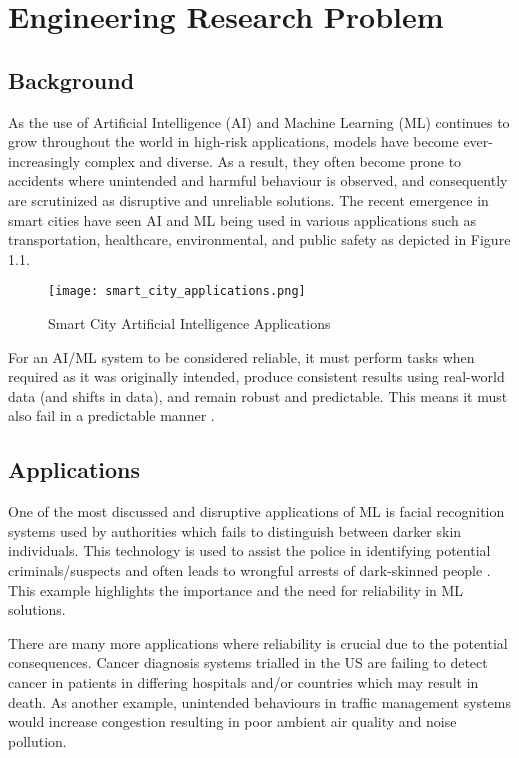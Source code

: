 \chapter{Engineering Research Problem}
\setcounter{page}{1}
\label{chap:chap1}

\section{Background }
As the use of Artificial Intelligence (AI) and Machine 
Learning (ML) continues to grow throughout the world 
in high-risk applications, models have become 
ever-increasingly complex and diverse. As a result, 
they often become prone to accidents where unintended 
and harmful behaviour is observed, and consequently are 
scrutinized as disruptive and unreliable solutions. The 
recent emergence in smart cities have seen AI and ML being 
used in various applications such as transportation, 
healthcare, environmental, and public safety as depicted in Figure 1.1.

\begin{figure}[h]
    \texttt{[image: smart\_city\_applications.png]}
    \caption{Smart City Artificial Intelligence Applications \cite{chen}}
    \label{fig:smart}
\end{figure}

\enlargethispage{2\baselineskip}
For an AI/ML system to be considered reliable, it must 
perform tasks when required as it was originally 
intended, produce consistent results using real-world 
data (and shifts in data), and remain robust and 
predictable. This means it must also fail in a 
predictable manner \cite{Saif}. 

\section{Applications}
One of the most discussed and disruptive applications of ML is facial 
recognition systems used by authorities which fails to distinguish 
between darker skin individuals. This technology is used to assist the 
police in identifying potential criminals/suspects and often leads to 
wrongful arrests of dark-skinned people \cite{Moutafis}. This example highlights the 
importance and the need for reliability in ML solutions. 

There are many more applications where reliability is crucial due to the 
potential consequences. Cancer diagnosis systems trialled in the US are 
failing to detect cancer in patients in differing hospitals and/or countries which may result 
in death. As another example, unintended behaviours in traffic management systems would 
increase congestion resulting in poor ambient air quality and noise 
pollution.

